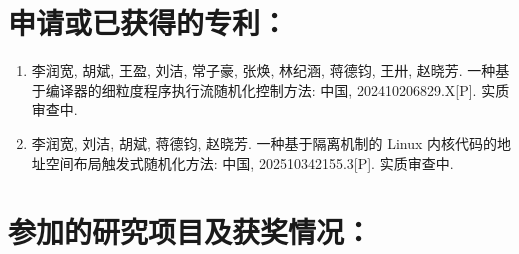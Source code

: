 \section*{申请或已获得的专利：}

{
\setlist[enumerate]{}%
\begin{enumerate}[nosep]
    \item 李润宽, 胡斌, 王盈, 刘洁, 常子豪, 张焕, 林纪涵, 蒋德钧, 王卅, 赵晓芳. 一种基于编译器的细粒度程序执行流随机化控制方法: 中国, 202410206829.X[P]. 实质审查中.%
    \item 李润宽, 刘洁, 胡斌, 蒋德钧, 赵晓芳. 一种基于隔离机制的 Linux 内核代码的地址空间布局触发式随机化方法: 中国, 202510342155.3[P]. 实质审查中.%
\end{enumerate}
}

\section*{参加的研究项目及获奖情况：}



\cleardoublepage[plain]%

